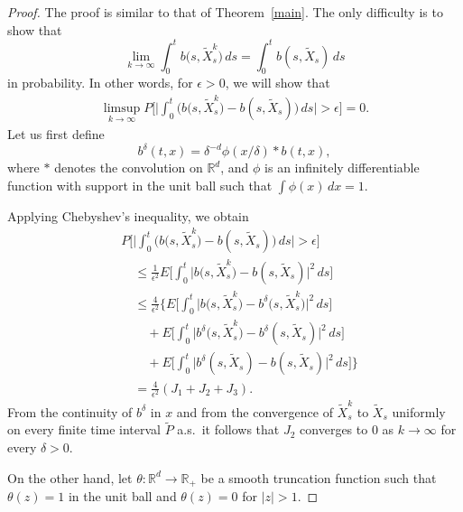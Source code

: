 \documentclass[numbers,compress,v1.0.1]{vmsta}
\def\R{{ \mathbb{R}}}
\theoremstyle{definition}
\newcommand{\rrvert}{\vert}
\newcommand{\llvert}{\vert}
\begin{document}
%
\begin{proof}
The proof is similar to that of Theorem~\ref{main}. The only difficulty
is to show that
%
\[
\lim_{k \rightarrow\infty}\int_0^t b\bigl(s,
\widetilde{X}^{k}_{s}\bigr)\,ds=\int_0^t
b(s,\widetilde{X}_{s})\,ds
\]
%
in probability. In other words,
for $\epsilon>0$, we will show that
%
\begin{eqnarray}
\label{desired-result} \limsup_{k \rightarrow\infty} P \Biggl[\Biggl\llvert \int
_0^t \bigl(b\bigl(s,\widetilde{X}^{k}_{s}
\bigr)- b(s,\widetilde{X}_{s}) \bigr) \,ds \Biggr\rrvert > \epsilon
\Biggr]=0.
\end{eqnarray}
%
Let us first define
%
\[
b^{\delta} (t,x)= \delta^{-d} \phi(x/\delta) \ast b(t,x) ,
\]
%
where $\ast$ denotes the convolution on $\R^d$, and $\phi$ is an
infinitely differentiable function with support in the unit ball such
that $\int\phi(x)\,dx = 1$.

Applying Chebyshev's inequality, we obtain
%
\begin{align*}
&P \Biggl[\Biggl\llvert \int_0^t\bigl(b\bigl(s,\widetilde{X}^{k}_{s}\bigr)- b(s,\widetilde{X}_{s}) \bigr) \,ds\Biggr\rrvert > \epsilon \Biggr]\nonumber\\
&\quad \leq \frac{1}{\epsilon^2} E \Biggl[\int_0^t\bigl| b\bigl(s,\widetilde{X}^{k}_{s}\bigr)- b(s,\widetilde{X}_{s})\bigr|^{2} \,ds \Biggr]\nonumber\\
&\quad \leq \frac{4}{\epsilon^2} \Biggl\{ E \Biggl[\int_0^t\bigl|b\bigl(s,\widetilde {X}^{k}_{s}\bigr)- b^{\delta}\bigl(s,\widetilde{X}^{k}_{s}\bigr)\bigr|^{2} \,ds\Biggr]\nonumber\\
&\qquad + E \Biggl[\int_0^t\bigl|b^{\delta} \bigl(s,\widetilde{X}^{k}_{s}\bigr)-b^{\delta} (s,\widetilde{X}_{s})\bigr|^{2} \,ds \Biggr]\nonumber\\
&\qquad + E \Biggl[\int_0^t\bigl|b^{\delta} (s,\widetilde{X}_{s})- b(s,\widetilde{X}_{s})\bigr|^{2}\,ds \Biggr] \Biggr\}\nonumber\\
&\quad = \frac{4}{\epsilon^2}(J_1+J_2+J_3).
\end{align*}
%
From the continuity of $b^{\delta}$ in $x$ and from the convergence of
$\widetilde{X}^{k}_{s}$ to $\widetilde{X}_{s}$ uniformly on every
finite time interval $\widetilde{P} $ a.s.\ it follows that $J_2$
converges to 0 as $k \rightarrow\infty$ for every $\delta>0$.\vadjust{\eject}

On the other hand, let $\theta: \mathbb R^d\rightarrow\mathbb R_+ $
be a smooth truncation function
such that $\theta(z)=1$ in the unit ball and $\theta(z)=0$ for
$|z|>1$.


\end{proof}
\end{document}
